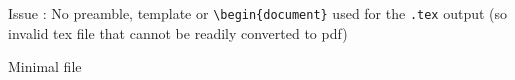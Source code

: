 Issue : No preamble, template or
\texttt{\textbackslash{}begin\{document\}} used for the \texttt{.tex}
output (so invalid tex file that cannot be readily converted to pdf)

Minimal file
